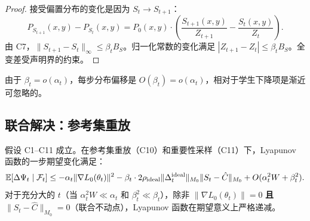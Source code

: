 \begin{proof}
接受偏置分布的变化是因为 $S_t \to S_{t+1}$：
\begin{equation}
    P_{S_{t+1}}(x,y) - P_{S_t}(x,y) = P_0(x,y) \cdot \left(\frac{S_{t+1}(x,y)}{Z_{t+1}} - \frac{S_t(x,y)}{Z_t}\right).
\end{equation}
由 C7，$\|S_{t+1} - S_t\|_\infty \leq \beta_t B_S$。归一化常数的变化满足 $|Z_{t+1} - Z_t| \leq \beta_t B_S$。全变差受声明界的约束。
\end{proof}

由于 $\beta_t = o(\alpha_t)$，每步分布偏移是 $O(\beta_t) = o(\alpha_t)$，相对于学生下降项是渐近可忽略的。

\subsection{联合解决：参考集重放}

\begin{theorem}\label{thm:lyapunov-proven}
假设 C1--C11 成立。在参考集重放（C10）和重要性采样（C11）下，Lyapunov 函数的一步期望变化满足：
\begin{equation}\label{eq:lyapunov-final}
    \mathbb{E}[\Delta\Psi_t \mid \mathcal{F}_t] \leq -\alpha_t \|\nabla L_0(\theta_t)\|^2 - \beta_t \cdot 2\rho_{\text{ideal}} \|\Delta_t^{\text{ideal}}\|_{M_0} \|S_t - \hat{C}\|_{M_0} + O(\alpha_t^2 W + \beta_t^2).
\end{equation}
对于充分大的 $t$（当 $\alpha_t^2 W \ll \alpha_t$ 和 $\beta_t^2 \ll \beta_t$），除非 $\|\nabla L_0(\theta_t)\| = 0$ \textbf{且} $\|S_t - \hat{C}\|_{M_0} = 0$（联合不动点），Lyapunov 函数在期望意义上严格递减。
\end{theorem}

